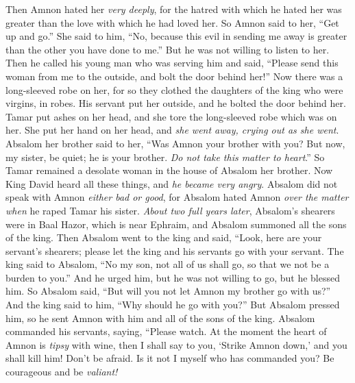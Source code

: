 \begin{biblechapter}
\verse Then Amnon hated her \textit{very deeply}, for the hatred with which he hated her was greater than the love with which he had loved her. So Amnon said to her, “Get up and go.”
\verse She said to him, “No, because this evil in sending me away is greater than the other you have done to me.” But he was not willing to listen to her.
\verse Then he called his young man who was serving him and said, “Please send this woman from me to the outside, and bolt the door behind her!”
\verse Now there was a long-sleeved robe on her, for so they clothed the daughters of the king who were virgins, in robes. His servant put her outside, and he bolted the door behind her.
\verse Tamar put ashes on her head, and she tore the long-sleeved robe which was on her. She put her hand on her head, and \textit{she went away, crying out as she went}.
\verse Absalom her brother said to her, “Was Amnon your brother with you? But now, my sister, be quiet; he is your brother. \textit{Do not take this matter to heart}.” So Tamar remained a desolate woman in the house of Absalom her brother.
 Now King David heard all these things, and \textit{he became very angry}.
\verse Absalom did not speak with Amnon \textit{either bad or good}, for Absalom hated Amnon \textit{over the matter when} he raped Tamar his sister.
\verse \textit{About two full years later}, Absalom’s shearers were in Baal Hazor, which is near Ephraim, and Absalom summoned all the sons of the king.
\verse Then Absalom went to the king and said, “Look, here are your servant’s shearers; please let the king and his servants go with your servant.
\verse The king said to Absalom, “No my son, not all of us shall go, so that we not be a burden to you.” And he urged him, but he was not willing to go, but he blessed him.
\verse So Absalom said, “But will you not let Amnon my brother go with us?” And the king said to him, “Why should he go with you?”
\verse But Absalom pressed him, so he sent Amnon with him and all of the sons of the king.
\verse Absalom commanded his servants, saying, “Please watch. At the moment the heart of Amnon is \textit{tipsy} with wine, then I shall say to you, ‘Strike Amnon down,’ and you shall kill him! Don’t be afraid. Is it not I myself who has commanded you? Be courageous and be \textit{valiant!}

\end{biblechapter}

